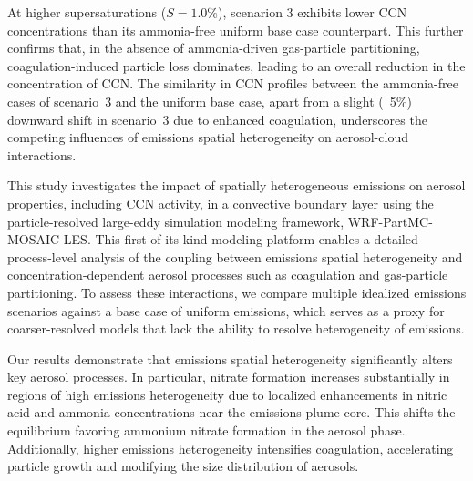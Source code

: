 \documentclass[journal abbreviation, manuscript]{copernicus}
\begin{document}
At higher supersaturations ($S=1.0\%$), scenarion 3 exhibits lower CCN
concentrations than its ammonia-free uniform base case
counterpart. This further confirms that, in the absence of
ammonia-driven gas-particle partitioning, coagulation-induced particle
loss dominates, leading to an overall reduction in the concentration of 
CCN. The similarity in CCN profiles between the ammonia-free
cases of scenario~3 and the uniform base case, apart from a slight
(~5\%) downward shift in scenario~3 due to enhanced coagulation,
underscores the competing influences of emissions spatial
heterogeneity on aerosol-cloud interactions.

\conclusions  %


This study investigates the impact of spatially heterogeneous
emissions on aerosol properties, including CCN activity, in a
convective boundary layer using the particle-resolved large-eddy
simulation modeling framework, WRF-PartMC-MOSAIC-LES. This
first-of-its-kind modeling platform enables a detailed process-level
analysis of the coupling between emissions spatial heterogeneity and
concentration-dependent aerosol processes such as coagulation and
gas-particle partitioning. To assess these interactions, we compare
multiple idealized emissions scenarios against a base case of uniform
emissions, which serves as a proxy for coarser-resolved models that
lack the ability to resolve heterogeneity of emissions.

Our results demonstrate that emissions spatial heterogeneity
significantly alters key aerosol processes. In particular, nitrate
formation increases substantially in regions of high emissions
heterogeneity due to localized enhancements in nitric acid and ammonia
concentrations near the emissions plume core. This shifts the
equilibrium favoring ammonium nitrate formation in the aerosol
phase. Additionally, higher emissions heterogeneity intensifies
coagulation, accelerating particle growth and modifying the size
distribution of aerosols.
\end{document}
